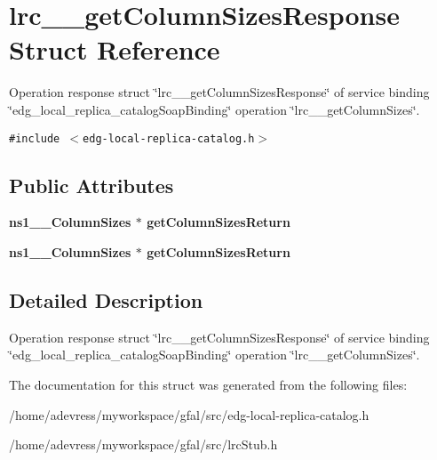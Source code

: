 \section{lrc\_\-\_\-get\-Column\-Sizes\-Response Struct Reference}
\label{structlrc____getColumnSizesResponse}
Operation response struct \char`\"{}lrc\_\-\_\-get\-Column\-Sizes\-Response\char`\"{} of service binding \char`\"{}edg\_\-local\_\-replica\_\-catalog\-Soap\-Binding\char`\"{} operation \char`\"{}lrc\_\-\_\-get\-Column\-Sizes\char`\"{}.  


{\tt \#include $<$edg-local-replica-catalog.h$>$}

\subsection*{Public Attributes}
\begin{CompactItemize}
\item 
\bf{ns1\_\-\_\-Column\-Sizes} $\ast$ \textbf{get\-Column\-Sizes\-Return}\label{structlrc____getColumnSizesResponse_381fddb0eaac4835acea878969bec034}

\item 
\bf{ns1\_\-\_\-Column\-Sizes} $\ast$ \textbf{get\-Column\-Sizes\-Return}\label{structlrc____getColumnSizesResponse_381fddb0eaac4835acea878969bec034}

\end{CompactItemize}


\subsection{Detailed Description}
Operation response struct \char`\"{}lrc\_\-\_\-get\-Column\-Sizes\-Response\char`\"{} of service binding \char`\"{}edg\_\-local\_\-replica\_\-catalog\-Soap\-Binding\char`\"{} operation \char`\"{}lrc\_\-\_\-get\-Column\-Sizes\char`\"{}. 



The documentation for this struct was generated from the following files:\begin{CompactItemize}
\item 
/home/adevress/myworkspace/gfal/src/edg-local-replica-catalog.h\item 
/home/adevress/myworkspace/gfal/src/lrc\-Stub.h\end{CompactItemize}
